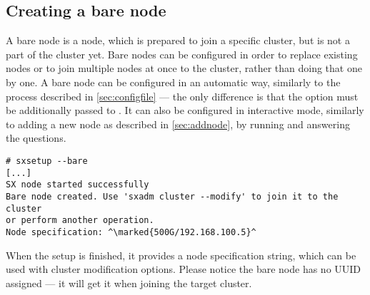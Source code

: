 \subsection{Creating a bare node}
A bare node is a node, which is prepared to join a specific cluster, but is
not a part of the cluster yet. Bare nodes can be configured in order to
replace existing nodes or to join multiple nodes at once to the cluster,
rather than doing that one by one. A bare node can be configured in an
automatic way, similarly to the process described in
{\ifpdf{}\else\ref{sec:configfile}\fi}
--- the only difference is that the option  must be additionally
passed to . It can also be configured in interactive mode,
similarly to adding a new node as described in
{\ifpdf{}\else\ref{sec:addnode}\fi}, by
running  and answering the questions.
\begin{lstlisting}
# sxsetup --bare
[...]
SX node started successfully
Bare node created. Use 'sxadm cluster --modify' to join it to the cluster
or perform another operation.
Node specification: ^\marked{500G/192.168.100.5}^
\end{lstlisting}
When the setup is finished, it provides a node specification string, which
can be used with cluster modification options. Please notice the bare node
has no UUID assigned --- it will get it when joining the target cluster.

